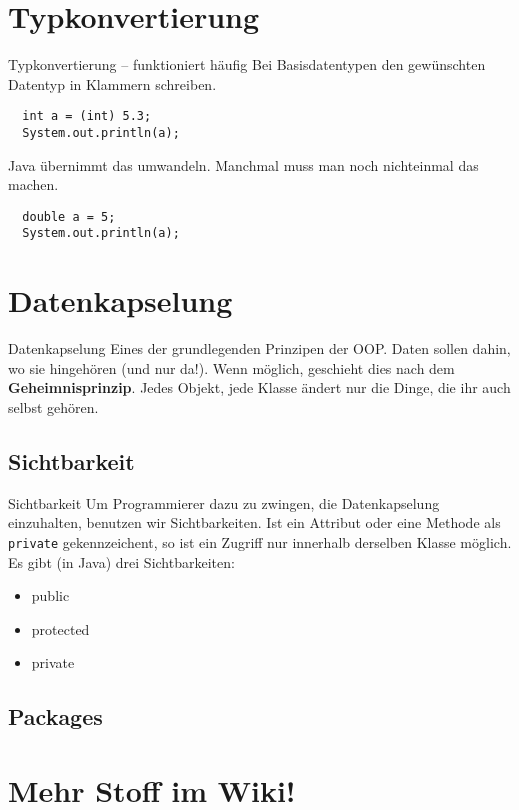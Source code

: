 \documentclass[18pt]{beamer}
\begin{document}
\section{Typkonvertierung}
\begin{frame}[fragile]{Typkonvertierung – funktioniert häufig}
Bei Basisdatentypen den gewünschten Datentyp in Klammern schreiben.
 \begin{lstlisting}
  int a = (int) 5.3;
  System.out.println(a);
 \end{lstlisting}
 \pause
Java übernimmt das umwandeln. Manchmal muss man noch nichteinmal das machen.
 \begin{lstlisting}
  double a = 5;
  System.out.println(a);
 \end{lstlisting}
\end{frame}

\section{Datenkapselung}
\begin{frame}{Datenkapselung}
 Eines der grundlegenden Prinzipen der OOP.
 Daten sollen dahin, wo sie hingehören (und nur da!).
  Wenn möglich, geschieht dies nach dem \textbf{Geheimnisprinzip}. Jedes
  Objekt, jede Klasse ändert nur die Dinge, die ihr auch selbst gehören.
\end{frame}

\subsection{Sichtbarkeit}
\begin{frame}[fragile]{Sichtbarkeit}
 Um Programmierer dazu zu zwingen, die Datenkapselung einzuhalten,
 benutzen wir Sichtbarkeiten. Ist ein Attribut oder eine Methode als 
 \verb|private| gekennzeichent, so ist ein Zugriff nur innerhalb
 derselben Klasse möglich.
 Es gibt (in Java) drei Sichtbarkeiten:
 \begin{itemize}
  \item public
  \item protected
  \item private
 \end{itemize}
\end{frame}

\subsection{Packages}

\section{Mehr Stoff im Wiki!}
\end{document}
